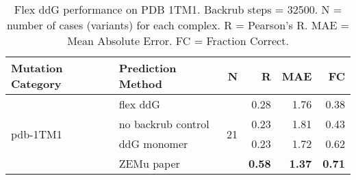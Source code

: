 \begin{table}
  \begin{tabular}{llrrrr}
\toprule
Mutation Category &   Prediction Method &   N &    R &  MAE &   FC \\
\midrule
 \multirow{ 4}{*}{pdb-1TM1} & flex ddG & \multirow{ 4}{*}{21} & 0.28 & 1.76 & 0.38  \\
 & no backrub control & & 0.23 & 1.81 & 0.43  \\
 & ddG monomer & & 0.23 & 1.72 & 0.62  \\
 & ZEMu paper & & \textbf{0.58} & \textbf{1.37} & \textbf{0.71}  \\
\bottomrule
\end{tabular}
  \caption[Flex ddG performance on PDB 1TM1]{
    Flex ddG performance on PDB 1TM1. Backrub steps = 32500. N = number of cases (variants) for each complex. R = Pearson's R. MAE = Mean Absolute Error. FC = Fraction Correct.
  } \label{tab:table-pdb-1TM1}
\end{table}
